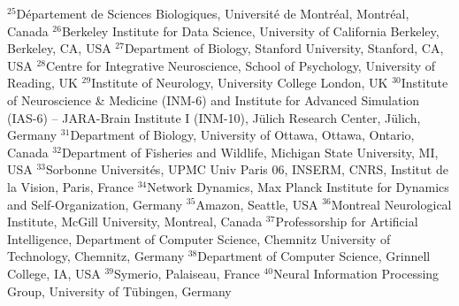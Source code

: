$^{25}$Département de Sciences Biologiques, Université de Montréal, Montréal, Canada
$^{26}$Berkeley Institute for Data Science, University of California Berkeley, Berkeley, CA, USA
$^{27}$Department of Biology, Stanford University, Stanford, CA, USA
$^{28}$Centre for Integrative Neuroscience, School of Psychology, University of Reading, UK
$^{29}$Institute of Neurology, University College London, UK
$^{30}$Institute of Neuroscience \& Medicine (INM-6) and Institute for Advanced Simulation (IAS-6) -- JARA-Brain Institute I (INM-10), Jülich Research Center, Jülich, Germany
$^{31}$Department of Biology, University of Ottawa, Ottawa, Ontario, Canada
$^{32}$Department of Fisheries and Wildlife, Michigan State University, MI, USA
$^{33}$Sorbonne Universités, UPMC Univ Paris 06, INSERM, CNRS, Institut de la Vision, Paris, France
$^{34}$Network Dynamics, Max Planck Institute for Dynamics and Self-Organization, Germany
$^{35}$Amazon, Seattle, USA
$^{36}$Montreal Neurological Institute, McGill University, Montreal, Canada
$^{37}$Professorship for Artificial Intelligence, Department of Computer Science, Chemnitz University of Technology, Chemnitz, Germany
$^{38}$Department of Computer Science, Grinnell College, IA, USA
$^{39}$Symerio, Palaiseau, France
$^{40}$Neural Information Processing Group, University of Tübingen, Germany
\par